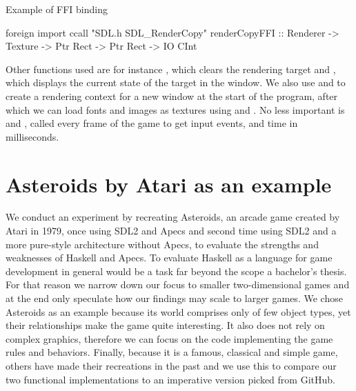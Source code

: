 \documentclass[
  digital, %
  color,   %
  table,   %
  oneside, %
  lof,     %
  lot,     %
]{fithesis3}
\begin{document}
\begin{listing}[H]
\caption{Example of FFI binding}
\label{lst:ffi}
\begin{haskell}
foreign import ccall "SDL.h SDL_RenderCopy" renderCopyFFI
    :: Renderer -> Texture -> Ptr Rect -> Ptr Rect -> IO CInt
\end{haskell}
\end{listing}

Other  functions used are for instance ,
which clears the rendering target and , which displays the
current state of the target in the window. We also use 
and  to create a rendering context for a new window
at the start of the program, after which we can load fonts and images as textures
using  and .
No less important is  and ,
called every frame of the game to get input events, and time in milliseconds.


\section{Asteroids by Atari as an example}
\label{sect:whyasteroids}
We conduct an experiment by recreating Asteroids, an arcade game
created by Atari in 1979, once using SDL2 and Apecs and second time
using SDL2 and a more pure-style architecture without Apecs,
to evaluate the strengths and weaknesses of Haskell and Apecs.
To evaluate Haskell as a language for game development in general
would be a task far beyond the scope a bachelor's thesis. For that reason
we narrow down our focus to smaller two-dimensional games and at the end
only speculate how our findings may scale to larger games.
We chose Asteroids as an example because its world comprises only of
few object types, yet their relationships make the game quite interesting.
It also does not rely on complex graphics, therefore we can focus
on the code implementing the game rules and behaviors. Finally,
because it is a famous, classical and simple game, others have made their recreations
in the past and we use this to compare our two functional implementations
to an imperative version picked from GitHub.
\end{document}
